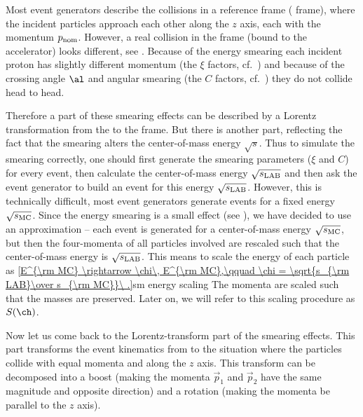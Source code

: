 Most event generators describe the collisions in a reference frame ( frame), where the incident particles approach each other along the $z$ axis, each with the momentum $p_{\rm nom}$. However, a real collision in the  frame (bound to the accelerator) looks different, see . Because of the energy smearing each incident proton has slightly different momentum (the $\xi$ factors, cf.~) and because of the crossing angle $\al$ and angular smearing (the $C$ factors, cf.~) they do not collide head to head.


Therefore a part of these smearing effects can be described by a Lorentz transformation from the  to the  frame. But there is another part, reflecting the fact that the smearing alters the center-of-mass energy $\sqrt s$. Thus to simulate the smearing correctly, one should first generate the smearing parameters ($\xi$ and $C$) for every event, then calculate the center-of-mass energy $\sqrt{s_{\rm LAB}}$ and then ask the event generator to build an event for this energy $\sqrt{s_{\rm LAB}}$. However, this is technically difficult, most event generators generate events for a fixed energy $\sqrt{s_{\rm MC}}$. Since the energy smearing is a small effect (see ), we have decided to use an approximation -- each event is generated for a center-of-mass energy $\sqrt{s_{\rm MC}}$, but then the four-momenta of all particles involved are rescaled such that the center-of-mass energy is $\sqrt{s_{\rm LAB}}$. This means to scale the energy of each particle as
\eqref{E^{\rm MC} \rightarrow \chi\, E^{\rm MC},\qquad \chi = \sqrt{s_{\rm LAB}\over s_{\rm MC}}\ .}{sm energy scaling}
The momenta are scaled such that the masses are preserved. Later on, we will refer to this scaling procedure as $S(\ch)$.

Now let us come back to the Lorentz-transform part of the smearing effects. This part transforms the event kinematics from  to the situation where the particles collide with equal momenta and along the $z$ axis. This transform can be decomposed into a boost (making the momenta $\vec p_1$ and $\vec p_2$ have the same magnitude and opposite direction) and a rotation (making the momenta be parallel to the $z$ axis).

